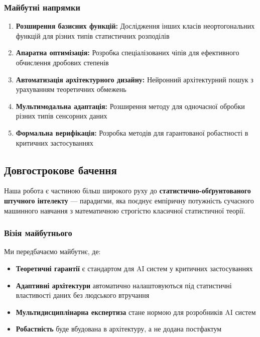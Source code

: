 \documentclass[12pt,a4paper]{article}
\begin{document}
\subsubsection{Майбутні напрямки}

\begin{enumerate}
	\item \textbf{Розширення базисних функцій:} Дослідження інших класів неортогональних функцій для різних типів статистичних розподілів
	
	\item \textbf{Апаратна оптимізація:} Розробка спеціалізованих чіпів для ефективного обчислення дробових степенів
	
	\item \textbf{Автоматизація архітектурного дизайну:} Нейронний архітектурний пошук з урахуванням теоретичних обмежень
	
	\item \textbf{Мультимодальна адаптація:} Розширення методу для одночасної обробки різних типів сенсорних даних
	
	\item \textbf{Формальна верифікація:} Розробка методів для гарантованої робастності в критичних застосуваннях
\end{enumerate}

\subsection{Довгострокове бачення}

Наша робота є частиною більш широкого руху до \textbf{статистично-обґрунтованого штучного інтелекту} --- парадигми, яка поєднує емпіричну потужність сучасного машинного навчання з математичною строгістю класичної статистичної теорії.

\subsubsection{Візія майбутнього}

Ми передбачаємо майбутнє, де:
\begin{itemize}
	\item \textbf{Теоретичні гарантії} є стандартом для AI систем у критичних застосуваннях
	\item \textbf{Адаптивні архітектури} автоматично налаштовуються під статистичні властивості даних без людського втручання
	\item \textbf{Мультидисциплінарна експертиза} стане нормою для розробників AI систем
	\item \textbf{Робастність} буде вбудована в архітектуру, а не додана постфактум
\end{itemize}
\end{document}
